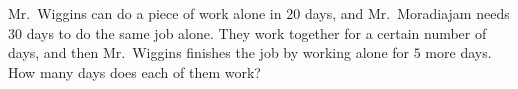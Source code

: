 Mr.\ Wiggins can do a piece of work alone in $20$ days, and Mr.\ Moradiajam needs $30$ days to do the same job alone. They work together for a certain number of days, and then Mr.\ Wiggins finishes the job by working alone for $5$ more days. How many days does each of them work?
